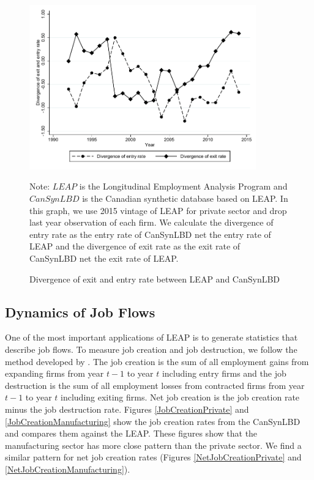 \documentclass{article}
\begin{document}
\begin{figure} [H]
\centering
\caption{Divergence of exit and entry rate between LEAP and CanSynLBD} \label{Divergence}
\includegraphics[height=2.8in, width=.7\linewidth]{graphs/Divergence_of_exit_and_entry_rate_between_LEAP_and_CanSynLBD_bw.pdf} 
\begin{minipage}{0.85\textwidth}
{\footnotesize Note: $LEAP$ is the Longitudinal Employment Analysis Program and $CanSynLBD$ is the Canadian synthetic database based on LEAP. In this graph, we use 2015 vintage of LEAP for private sector and drop last year observation of each firm. We calculate the divergence of entry rate as the entry rate of CanSynLBD net the entry rate of LEAP and the divergence of exit rate as the exit rate of CanSynLBD net the exit rate of LEAP. \par}
\end{minipage}
\end{figure}


\subsection{Dynamics of Job Flows}
One of the most important applications of LEAP is to generate statistics that describe job flows. To measure job creation and job destruction, we follow the method developed by \cite{DavisHaltiwangerSchuh}. The job creation is the sum of all employment gains from expanding firms from year $t-1$ to year $t$ including entry firms and the job destruction is the sum of all employment losses from contracted firms from year $t-1$ to year $t$ including exiting firms. Net job creation is the job creation rate minus the job destruction rate. Figures \ref{JobCreationPrivate} and \ref{JobCreationManufacturing} show the job creation rates from the CanSynLBD and compares them against the LEAP. These figures show that the manufacturing sector has more close pattern than the private sector. We find a similar pattern for net job creation rates (Figures \ref{NetJobCreationPrivate} and  \ref{NetJobCreationManufacturing}).
\end{document}
